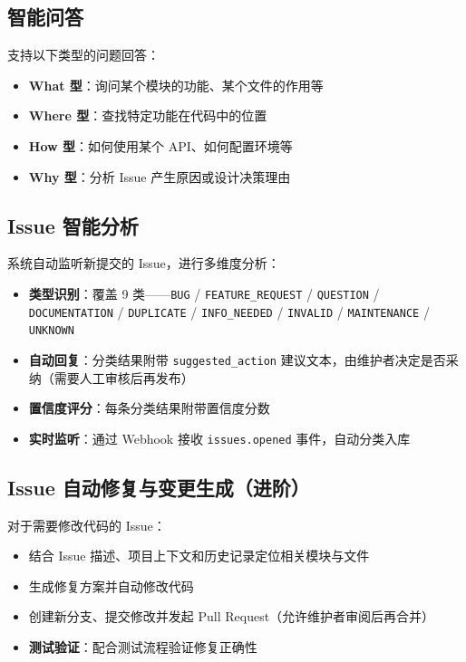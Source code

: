 \documentclass[10pt,a4paper]{article}
\begin{document}
\subsection{智能问答}

支持以下类型的问题回答：

\begin{itemize}
    \item \textbf{What 型}：询问某个模块的功能、某个文件的作用等
    \item \textbf{Where 型}：查找特定功能在代码中的位置
    \item \textbf{How 型}：如何使用某个 API、如何配置环境等
    \item \textbf{Why 型}：分析 Issue 产生原因或设计决策理由
\end{itemize}

\subsection{Issue 智能分析}

系统自动监听新提交的 Issue，进行多维度分析：

\begin{itemize}
    \item \textbf{类型识别}：覆盖 9 类——\texttt{BUG} / \texttt{FEATURE\_REQUEST} / \texttt{QUESTION} / \texttt{DOCUMENTATION} / \texttt{DUPLICATE} / \texttt{INFO\_NEEDED} / \texttt{INVALID} / \texttt{MAINTENANCE} / \texttt{UNKNOWN}
    \item \textbf{自动回复}：分类结果附带 \texttt{suggested\_action} 建议文本，由维护者决定是否采纳（需要人工审核后再发布）
    \item \textbf{置信度评分}：每条分类结果附带置信度分数
    \item \textbf{实时监听}：通过 Webhook 接收 \texttt{issues.opened} 事件，自动分类入库
\end{itemize}

\subsection{Issue 自动修复与变更生成（进阶）}
\label{sec:autofix}

对于需要修改代码的 Issue：

\begin{itemize}
    \item 结合 Issue 描述、项目上下文和历史记录定位相关模块与文件
    \item 生成修复方案并自动修改代码
    \item 创建新分支、提交修改并发起 Pull Request（允许维护者审阅后再合并）
    \item \textbf{测试验证}：配合测试流程验证修复正确性
\end{itemize}
\end{document}
